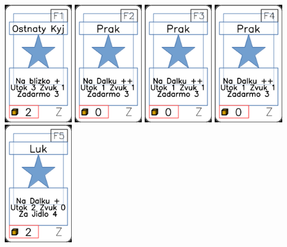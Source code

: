 \documentclass[a4paper]{article}
\begin{document}
	\includegraphics[width=3.0cm]{img-1_85}
	\includegraphics[width=3.0cm]{img-1_86}
	\includegraphics[width=3.0cm]{img-1_87}
	\includegraphics[width=3.0cm]{img-1_88}
	\includegraphics[width=3.0cm]{img-1_89}
\end{document}
